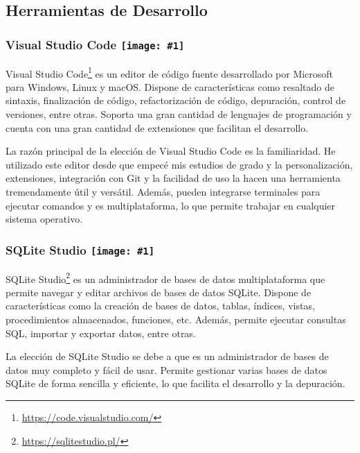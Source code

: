\newpage

\subsection{Herramientas de Desarrollo}

\renewcommand{\icon}[1]{\texttt{[image: \#1]}}
\subsubsection*{Visual Studio Code \protect\icon{./imagenes/vscode_logo.png}}

Visual Studio Code\footnote{\url{https://code.visualstudio.com/}} es un editor de código fuente desarrollado por Microsoft para Windows, Linux y macOS. Dispone de características como resaltado de sintaxis, finalización de código, refactorización de código, depuración, control de versiones, entre otras. Soporta una gran cantidad de lenguajes de programación y cuenta con una gran cantidad de extensiones que facilitan el desarrollo. \newline

La razón principal de la elección de Visual Studio Code es la familiaridad. He utilizado este editor desde que empecé mis estudios de grado y la personalización, extensiones, integración con Git y la facilidad de uso la hacen una herramienta tremendamente útil y versátil. Además, pueden integrarse terminales para ejecutar comandos y es multiplataforma, lo que permite trabajar en cualquier sistema operativo.\newline

\renewcommand{\icon}[1]{\texttt{[image: \#1]}}
\subsubsection*{SQLite Studio \protect\icon{./imagenes/sqlite_logo.png}}


SQLite Studio\footnote{\url{https://sqlitestudio.pl/}} es un administrador de bases de datos multiplataforma que permite navegar y editar archivos de bases de datos SQLite. Dispone de características como la creación de bases de datos, tablas, índices, vistas, procedimientos almacenados, funciones, etc. Además, permite ejecutar consultas SQL, importar y exportar datos, entre otras.\newline

La elección de SQLite Studio se debe a que es un administrador de bases de datos muy completo y fácil de usar. Permite gestionar varias bases de datos SQLite de forma sencilla y eficiente, lo que facilita el desarrollo y la depuración.\newline

